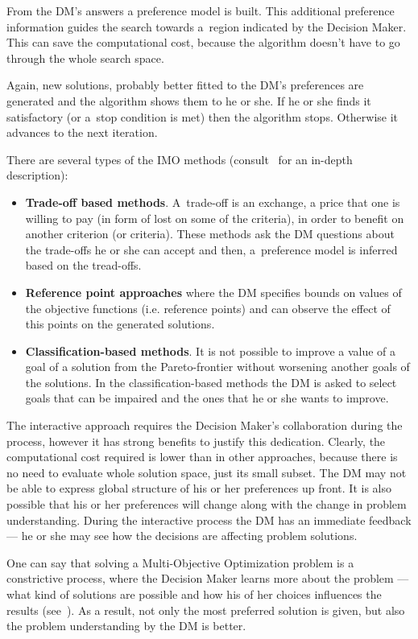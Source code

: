 From the DM's answers a preference model is built. This additional preference
information guides the search towards a~region indicated by the Decision
Maker. This can save the computational cost, because the algorithm doesn't
have to go through the whole search space.

Again, new solutions, probably better fitted to the DM's preferences are
generated and the algorithm shows them to he or she. If he or she finds it
satisfactory (or a~stop condition is met) then the algorithm stops. Otherwise
it advances to the next iteration.

There are several types of the IMO methods (consult~\cite{MRW08} for an
in-depth description):
\begin{itemize}
\item \textbf{Trade-off based methods}. A~trade-off is an exchange, a price that
  one is willing to pay (in form of lost on some of the criteria), in order to
  benefit on another criterion (or criteria). These methods ask the DM
  questions about the trade-offs he or she can accept and then, a~preference
  model is inferred based on the tread-offs.
\item \textbf{Reference point approaches} where the DM specifies bounds on
  values of the objective functions (i.e. reference points) and can observe
  the effect of this points on the generated solutions.
\item \textbf{Classification-based methods}. It is not possible to improve a
  value of a goal of a solution from the Pareto-frontier without worsening
  another goals of the solutions. In the classification-based methods the DM
  is asked to select goals that can be impaired and the ones that he or she
  wants to improve.
\end{itemize}

The interactive approach requires the Decision Maker's collaboration during
the process, however it has strong benefits to justify this
dedication. Clearly, the computational cost required is lower than in other
approaches, because there is no need to evaluate whole solution space, just
its small subset. The DM may not be able to express global structure of his or
her preferences up front. It is also possible that his or her preferences will
change along with the change in problem understanding. During the interactive
process the DM has an immediate feedback --- he or she may see how the
decisions are affecting problem solutions.

One can say that solving a Multi-Objective Optimization problem is a
constrictive process, where the Decision Maker learns more about the problem
--- what kind of solutions are possible and how his of her choices influences
the results (see~\cite{MRW08}). As a result, not only the most preferred
solution is given, but also the problem understanding by the DM is better.


